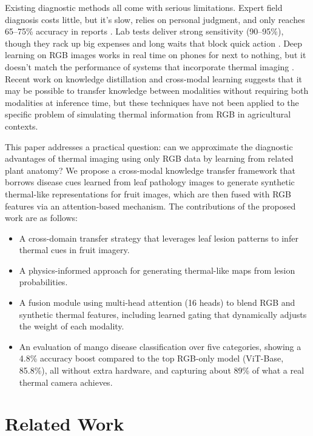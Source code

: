 \documentclass[utf8]{FrontiersinHarvard} %
\begin{document}
Existing diagnostic methods all come with serious limitations. Expert field diagnosis costs little, but it's slow, relies on personal judgment, and only reaches 65–75\% accuracy in reports \cite{ferentinos2018}. Lab tests deliver strong sensitivity (90–95\%), though they rack up big expenses and long waits that block quick action \cite{martinelli2015}. Deep learning on RGB images works in real time on phones for next to nothing, but it doesn't match the performance of systems that incorporate thermal imaging \cite{mohanty2016,hasan2024}. Recent work on knowledge distillation \cite{hinton2015,li2023_kd} and cross-modal learning \cite{xu2023} suggests that it may be possible to transfer knowledge between modalities without requiring both modalities at inference time, but these techniques have not been applied to the specific problem of simulating thermal information from RGB in agricultural contexts.

This paper addresses a practical question: can we approximate the diagnostic advantages of thermal imaging using only RGB data by learning from related plant anatomy? We propose a cross-modal knowledge transfer framework that borrows disease cues learned from leaf pathology images to generate synthetic thermal-like representations for fruit images, which are then fused with RGB features via an attention-based mechanism. The contributions of the proposed work are as follows:

\begin{itemize}
    \item A cross-domain transfer strategy that leverages leaf lesion patterns to infer thermal cues in fruit imagery.
    \item A physics-informed approach for generating thermal-like maps from lesion probabilities.
    
    \item A fusion module using multi-head attention (16 heads) to blend RGB and synthetic thermal features, including learned gating that dynamically adjusts the weight of each modality.
    
    \item An evaluation of mango disease classification over five categories, showing a 4.8\% accuracy boost compared to the top RGB-only model (ViT-Base, 85.8\%), all without extra hardware, and capturing about 89\% of what a real thermal camera achieves.
\end{itemize}


\section{Related Work}
\end{document}
